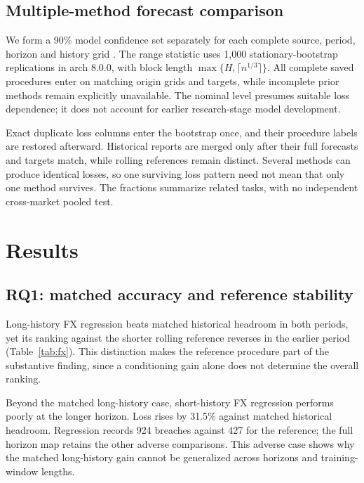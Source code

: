 \documentclass[11pt,a4paper]{article}
\begin{document}
\subsection{Multiple-method forecast comparison}

We form a 90\% model confidence set separately for each complete source, period, horizon and history grid \citep{mcs2011}. The range statistic uses 1,000 stationary-bootstrap replications in arch 8.0.0, with block length $\max\{H,\lceil n^{1/3}\rceil\}$. All complete saved procedures enter on matching origin grids and targets, while incomplete prior methods remain explicitly unavailable. The nominal level presumes suitable loss dependence; it does not account for earlier research-stage model development.

Exact duplicate loss columns enter the bootstrap once, and their procedure labels are restored afterward. Historical reports are merged only after their full forecasts and targets match, while rolling references remain distinct. Several methods can produce identical losses, so one surviving loss pattern need not mean that only one method survives. The fractions summarize related tasks, with no independent cross-market pooled test.

\FloatBarrier

\section{Results}\label{sec:results}

\subsection{RQ1: matched accuracy and reference stability}\label{sec:rq1}

Long-history FX regression beats matched historical headroom in both periods, yet its ranking against the shorter rolling reference reverses in the earlier period (Table~\ref{tab:fx}). This distinction makes the reference procedure part of the substantive finding, since a conditioning gain alone does not determine the overall ranking.

Beyond the matched long-history case, short-history FX regression performs poorly at the longer horizon. Loss rises by 31.5\% against matched historical headroom. Regression records 924 breaches against 427 for the reference; the full horizon map retains the other adverse comparisons. This adverse case shows why the matched long-history gain cannot be generalized across horizons and training-window lengths.
\end{document}
